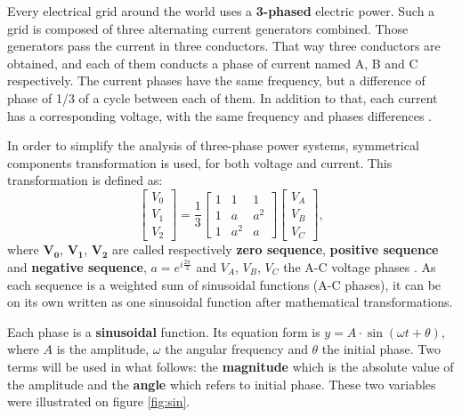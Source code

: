 Every electrical grid around the world uses a \textbf{3-phased} electric power. Such a grid is composed of three alternating current generators combined. Those generators pass the current in three conductors. That way three conductors are obtained, and each of them conducts a phase of current named A, B and C respectively. The current phases have the same frequency, but a difference of phase of 1/3 of a cycle between each of them. In addition to that, each current has a corresponding voltage, with the same frequency and phases differences \cite{noauthor_three-phase_2020}.

In order to simplify the analysis of three-phase power systems, symmetrical components transformation is used, for both voltage and current. This transformation is defined as:
\begin{equation}
     \begin{bmatrix}
        V_0 \\ V_1 \\ V_2 
    \end{bmatrix} = \frac 1 3 \begin{bmatrix}
        1 & 1& 1 \\
        1 & a & a^2 \\
        1 & a^2 & a
    \end{bmatrix}
    \begin{bmatrix}
        V_A \\ V_B \\ V_C
    \end{bmatrix},
\end{equation}
where $\mathbf{V_0}$, $\mathbf{V_1}$, $\mathbf{V_2}$ are called respectively \textbf{zero sequence}, \textbf{positive sequence} and \textbf{negative sequence}, $a = e^{i \frac{2\pi}{3}}$ and $V_A$, $V_B$, $V_C$ the A-C voltage phases \cite{jl_kirtley_jr_introduction_nodate}. As each sequence is a weighted sum of sinusoidal functions (A-C phases), it can be on its own written as one sinusoidal function after mathematical transformations.

Each phase is a \textbf{sinusoidal} function. Its equation form is $y = A \cdot \sin(\omega t + \theta)$, where $A$ is the amplitude, $\omega$ the angular frequency and $\theta$ the initial phase. Two terms will be used in what follows: the \textbf{magnitude} which is the absolute value of the amplitude and the \textbf{angle} which refers to initial phase. These two variables were illustrated on figure \ref{fig:sin}.

